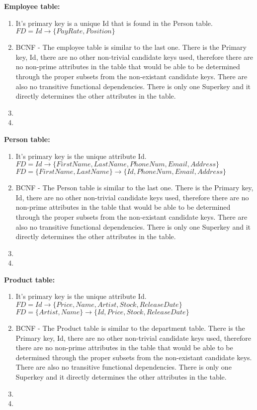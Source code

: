 \documentclass{article}
\begin{document}
  \par\textbf{Employee table:}
  \begin{enumerate}[label=\roman*]
  	\item It's primary key is a unique Id that is found in the Person table. \newline
    $FD = Id \rightarrow \{PayRate, Position\}$
  	\item BCNF - The employee table is similar to the last one. There is the Primary key, Id, there are no other non-trivial candidate keys used, therefore there are no non-prime attributes in the table that would be able to be determined through the proper subsets from the non-existant candidate keys. There are also no transitive functional dependencies. There is only one Superkey and it directly determines the other attributes in the table.
  	\item
  	\item
  \end{enumerate}
  \par\textbf{Person table:}
  \begin{enumerate}[label=\roman*]
  	\item It's primary key is the unique attribute Id. \newline
    $FD = Id \rightarrow \{FirstName, LastName, PhoneNum, Email, Address\}$\newline
    $FD = \{FirstName, LastName\} \rightarrow \{Id, PhoneNum, Email, Address\}$
  	\item BCNF - The Person table is similar to the last one. There is the Primary key, Id, there are no other non-trivial candidate keys used, therefore there are no non-prime attributes in the table that would be able to be determined through the proper subsets from the non-existant candidate keys. There are also no transitive functional dependencies. There is only one Superkey and it directly determines the other attributes in the table.
  	\item
  	\item
  \end{enumerate}
  \par\textbf{Product table:}
  \begin{enumerate}[label=\roman*]
  	\item It's primary key is the unique attribute Id. \newline
    $FD = Id \rightarrow \{Price, Name, Artist, Stock, ReleaseDate\}$\newline
    $FD = \{Artist, Name\} \rightarrow \{Id, Price, Stock, ReleaseDate\}$
  	\item BCNF - The Product table is similar to the department table. There is the Primary key, Id, there are no other non-trivial candidate keys used, therefore there are no non-prime attributes in the table that would be able to be determined through the proper subsets from the non-existant candidate keys. There are also no transitive functional dependencies. There is only one Superkey and it directly determines the other attributes in the table.
  	\item
  	\item
  \end{enumerate}
\end{document}
